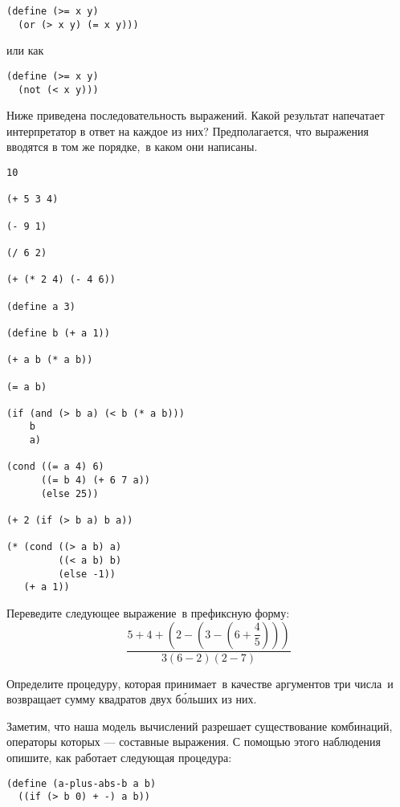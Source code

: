 \begin{Verbatim}[fontsize=\small]
(define (>= x y)
  (or (> x y) (= x y)))
\end{Verbatim}
или как

\begin{Verbatim}[fontsize=\small]
(define (>= x y)
  (not (< x y)))
\end{Verbatim}
\begin{exercise}{1.1}\label{EX1.1}%
Ниже приведена последовательность выражений. Какой
результат напечатает интерпретатор в ответ на каждое из них?
Предполагается, что  выражения вводятся в том же порядке,~в каком они написаны.

\begin{Verbatim}[fontsize=\small]
10

(+ 5 3 4)

(- 9 1)

(/ 6 2)

(+ (* 2 4) (- 4 6))

(define a 3)

(define b (+ a 1))

(+ a b (* a b))

(= a b)

(if (and (> b a) (< b (* a b)))
    b
    a)

(cond ((= a 4) 6)
      ((= b 4) (+ 6 7 a))
      (else 25))

(+ 2 (if (> b a) b a))

(* (cond ((> a b) a)
         ((< a b) b)
         (else -1))
   (+ a 1))
\end{Verbatim}
          
\end{exercise}
\begin{exercise}{1.2}\label{EX1.2}%
Переведите следующее выражение~в префиксную форму:
$$
\dfrac{5 + 4 + (2 - (3 - (6 + \dfrac{4}{5})))}
     {3(6 - 2)(2 - 7)}
$$
\end{exercise}
\begin{exercise}{1.3}\label{EX1.3}%
Определите процедуру, которая принимает~в качестве
аргументов три числа~и возвращает сумму квадратов двух б\'{о}льших из
них. 
\end{exercise}
\begin{exercise}{1.4}\label{EX1.4}%
Заметим, что наша модель вычислений разрешает
существование 
комбинаций, операторы которых --- составные выражения.
С помощью этого наблюдения опишите, как работает следующая
процедура: 

\begin{Verbatim}[fontsize=\small]
(define (a-plus-abs-b a b)
  ((if (> b 0) + -) a b))
\end{Verbatim}

\end{exercise}
